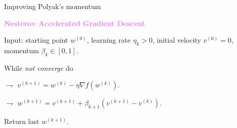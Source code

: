 \documentclass[xcolor={usenames,dvipsnames}]{beamer}
\begin{document}
%	
%
%
%
%
%
%	
%
%
%
%
%
%
%
%
%
%
%
%
%
%
%

\begin{frame}{Improving Polyak's momentum}

\textbf{\textcolor{violet}{Nesterov Accelerated Gradient Descent}}

\vspace{.3cm}

\alert{Input}: starting point $w^{(0)}$, learning rate $\eta_k > 0$, initial velocity $v^{(0)}=0$, momentum $\beta_k \in [0,1]$.

\vspace{.3cm}

While \emph{not converge} do    

$\rightharpoondown$ $v^{(k+1)} = w^{(k)} - \eta \nabla f (w^{(k)})$.

$\rightharpoondown$ $w^{(k+1)} = v^{(k+1)} + \beta_{k+1}( v^{(k+1)} - v^{(k)})$.

\vspace{.3cm}

\alert{Return} last $w^{(k+1)}$.


\end{frame}
\end{document}

